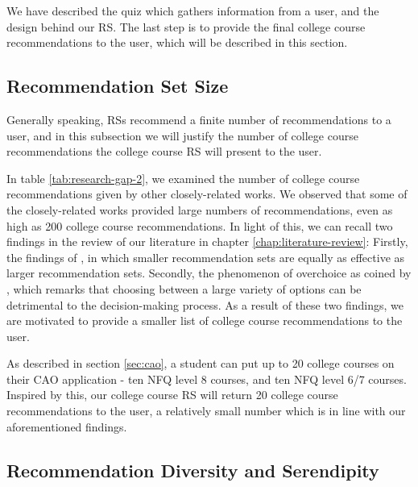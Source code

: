 We have described the quiz which gathers information from a user,
and the design behind our RS.
The last step is to provide the final college course recommendations to the user,
which will be described in this section.

\subsection{Recommendation Set Size}
\label{sec:rec-set-size}

Generally speaking, RSs recommend a finite number of recommendations to a user, 
and in this subsection we will justify the number of college course recommendations 
the college course RS will present to the user.

In table \ref{tab:research-gap-2}, we examined the number of college course recommendations 
given by other closely-related works.
We observed that some of the closely-related works provided large numbers of recommendations, 
even as high as 200 college course recommendations.
In light of this, we can recall two findings in the review of our literature in chapter \ref{chap:literature-review}:
Firstly, the findings of \cite{long2025choice}, in which smaller recommendation sets are equally 
as effective as larger recommendation sets.
Secondly, the phenomenon of overchoice as coined by \cite{toffler1970future},
which remarks that choosing between a large variety of options can be detrimental to the decision-making process.
As a result of these two findings, we are motivated to provide a smaller list of college course recommendations to the user.

As described in section \ref{sec:cao}, a student can put up to 20 college courses on their CAO application - ten NFQ level 8 courses, and ten NFQ level 6/7 courses.
Inspired by this, our college course RS will return 20 college course recommendations to the user,
a relatively small number which is in line with our aforementioned findings.

\subsection{Recommendation Diversity and Serendipity}
\label{sec:enhance-diversity-and-serendipity-recs}

